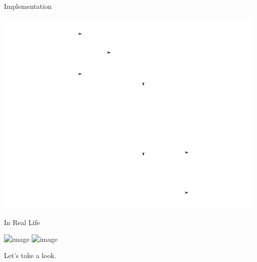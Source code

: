 \documentclass[10pt]{beamer}
\begin{document}
\begin{frame}{Implementation}
    \begin{center}
        \includegraphics{fig/hwarch.pdf}
    \end{center}
\end{frame}

\begin{frame}{In Real Life}
    \begin{center}
        \includegraphics<1>[scale=0.45]{fig/dcbiasbrd.jpg}
        \includegraphics<2>[scale=0.5]{fig/setup.jpg}
    \end{center}
\end{frame}

\begin{frame}
    \begin{center}
        Let's take a look.
    \end{center}
\end{frame}
\end{document}
